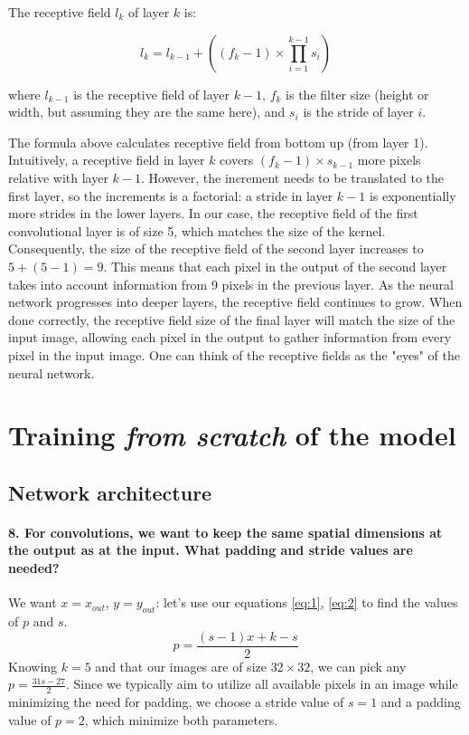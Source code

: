 The receptive field $l_k$ of layer $k$ is:

\[ l_k = l_{k-1} + \left((f_k - 1) \times \prod_{i=1}^{k-1}s_i\right) \]

where $l_{k-1}$ is the receptive field of layer $k-1$, $f_k$ is the filter size (height or width, but assuming they are the same here), and $s_i$ is the stride of layer $i$.

The formula above calculates receptive field from bottom up (from layer 1). Intuitively, a receptive field in layer $k$ covers $(f_k - 1) \times s_{k-1}$ more pixels relative with layer $k-1$. However, the increment needs to be translated to the first layer, so the increments is a factorial: a stride in layer $k-1$ is exponentially more strides in the lower layers. In our case, the receptive field of the first convolutional layer is of size 5, which matches the size of the kernel. Consequently, the size of the receptive field of the second layer increases to $ 5 + (5 - 1) = 9 $. This means that each pixel in the output of the second layer takes into account information from 9 pixels in the previous layer. As the neural network progresses into deeper layers, the receptive field continues to grow. When done correctly, the receptive field size of the final layer will match the size of the input image, allowing each pixel in the output to gather information from every pixel in the input image. One can think of the receptive fields as the "eyes" of the neural network.


\section{Training \textit{from scratch} of the model}
\subsection{Network architecture}
\paragraph{8. For convolutions, we want to keep the same spatial dimensions at the output as at the input. What padding and stride values are needed?}
We want $ x = x_{out}$, $ y = y_{out} $: let's use our equations \ref{eq:1}, \ref{eq:2} to find the values of $p$ and $s$.
\[
    p = \frac{(s-1)x + k - s}{2}
\]
Knowing $k = 5$ and that our images are of size $32 \times 32 $, we can pick any $p = \frac{31s - 27}{2}$. Since we typically aim to utilize all available pixels in an image while minimizing the need for padding, we choose a stride value of $ s = 1 $ and a padding value of $ p = 2 $, which minimize both parameters.


